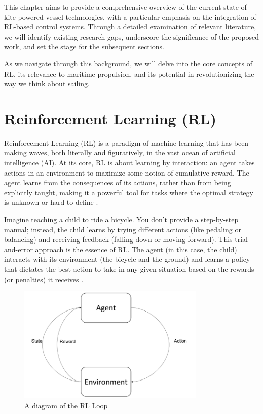 This chapter aims to provide a comprehensive overview of the current state of kite-powered vessel technologies, with a particular emphasis on the integration of RL-based control systems. Through a detailed examination of relevant literature, we will identify existing research gaps, underscore the significance of the proposed work, and set the stage for the subsequent sections.

As we navigate through this background, we will delve into the core concepts of RL, its relevance to maritime propulsion, and its potential in revolutionizing the way we think about sailing.

\section{Reinforcement Learning (RL)}\label{RL_background}

Reinforcement Learning (RL) is a paradigm of machine learning that has been making waves, both literally and figuratively, in the vast ocean of artificial intelligence (AI). At its core, RL is about learning by interaction: an agent takes actions in an environment to maximize some notion of cumulative reward. The agent learns from the consequences of its actions, rather than from being explicitly taught, making it a powerful tool for tasks where the optimal strategy is unknown or hard to define \cite{sutton2018reinforcement}.

Imagine teaching a child to ride a bicycle. You don't provide a step-by-step manual; instead, the child learns by trying different actions (like pedaling or balancing) and receiving feedback (falling down or moving forward). This trial-and-error approach is the essence of RL. The agent (in this case, the child) interacts with its environment (the bicycle and the ground) and learns a policy that dictates the best action to take in any given situation based on the rewards (or penalties) it receives \cite{watkins1992qlearning}.

\begin{figure}
    \centering
    \includegraphics[width=0.8\textwidth]{Images/RL_Loop.png}
    \caption{A diagram of the RL Loop}
    \label{fig:rl_diagram}
\end{figure}

